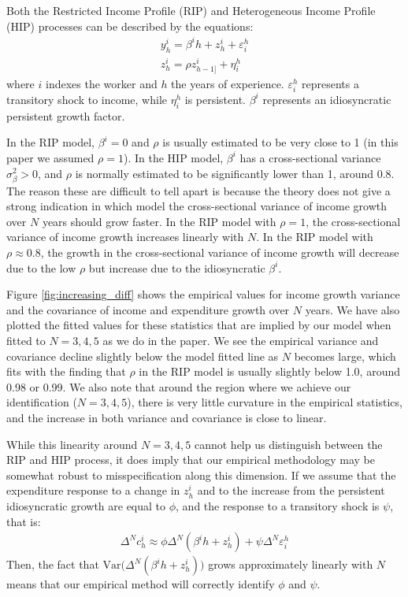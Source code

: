 \documentclass[titlepage]{\econtex}\newcommand{\texname}{ConsumptionHeterogeneity}
\begin{document}
	Both the Restricted Income Profile (RIP) and Heterogeneous Income Profile (HIP) processes can be described by the equations:
	\begin{align*}
	y_h^i = \beta^i h + z^i_h + \varepsilon^h_i\\
	z^i_h = \rho z^i_{h-1]} + \eta^h_i
	\end{align*}
	where $i$ indexes the worker and $h$ the years of experience. $\varepsilon^h_i$ represents a transitory shock to income, while $\eta^h_i$ is persistent. $\beta^i$ represents an idiosyncratic persistent growth factor.
	
	In the RIP model, $\beta^i=0$ and $\rho$ is usually estimated to be very close to 1 (in this paper we assumed $\rho=1$). In the HIP model, $\beta^i$ has a cross-sectional variance $\sigma_{\beta}^2>0$, and $\rho$ is normally estimated to be significantly lower than 1, around 0.8. The reason these are difficult to tell apart is because the theory does not give a strong indication in which model the cross-sectional variance of income growth over $N$ years should grow faster. In the RIP model with $\rho=1$, the cross-sectional variance of income growth increases linearly with $N$. In the RIP model with $\rho\approx 0.8$, the growth in the  cross-sectional variance of income growth will decrease due to the low $\rho$ but increase due to the idiosyncratic $\beta^i$.
	
	Figure \ref{fig:increasing_diff} shows the empirical values for income growth variance and the covariance of income and expenditure growth over $N$ years. We have also plotted the fitted values for these statistics that are implied by our model when fitted to $N=3,4,5$ as we do in the paper. We see the empirical variance and covariance decline slightly below the model fitted line as $N$ becomes large, which fits with the finding that $\rho$ in the RIP model is usually slightly below 1.0, around 0.98 or 0.99. We also note that around the region where we achieve our identification ($N=3,4,5$), there is very little curvature in the empirical statistics, and the increase in both variance and covariance is close to linear.
	
	While this linearity around $N=3,4,5$ cannot help us distinguish between the RIP and HIP process, it does imply that our empirical methodology may be somewhat robust to misspecification along this dimension. If we assume that the expenditure response to a change in $z^i_h$ and to the increase from the persistent idiosyncratic growth are equal to $\phi$, and the response to a transitory shock is $\psi$, that is:
	\begin{align*}
	\Delta^N c^i_h \approx \phi \Delta^N (\beta^i h + z^i_h) + \psi \Delta^N \varepsilon^h_i
	\end{align*}
	Then, the fact that $\mathrm{Var}\big( \Delta^N (\beta^i h + z^i_h) \big)$ grows approximately linearly with $N$ means that our empirical method will correctly identify $\phi$ and $\psi$.
	
\end{document}
